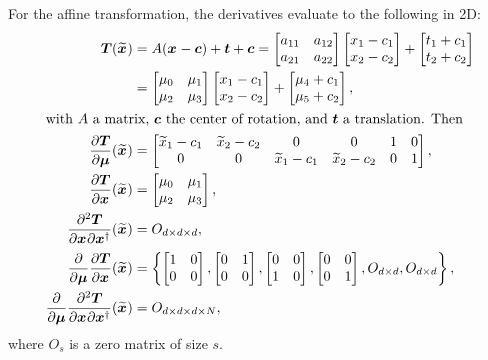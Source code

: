 \documentclass{InsightArticle}
\newcommand{\vT}{\bm{T}}
\newcommand{\vmu}{\bm{\mu}}
\newcommand{\vx}[1][]{\bm{x}_{#1}}
\newcommand{\vxt}[1][]{\bm{\widetilde x}_{#1}}
\newcommand{\D}[2]{\frac{\partial #1}{\partial #2}}
\newcommand{\Dd}[3]{\frac{\partial^2 #1}{\partial #2 \partial #3}}
\newcommand{\trp}{^{\dagger}}
\begin{document}
For the affine transformation, the derivatives evaluate to the
following in 2D:
\begin{align}
\vT(\vxt) &= A (\vx -\bm{c}) + \bm{t} + \bm{c} =
\begin{bmatrix} a_{11} & a_{12}
\\ a_{21} & a_{22} \end{bmatrix} \begin{bmatrix} x_1 - c_1 \\
x_2 - c_2 \end{bmatrix} + \begin{bmatrix} t_1 + c_1 \\
t_2 + c_2 \end{bmatrix} \\
 & = \begin{bmatrix} \mu_0 & \mu_1 \\
 \mu_2 & \mu_3 \end{bmatrix} \begin{bmatrix} x_1 - c_1 \\
x_2 - c_2 \end{bmatrix} + \begin{bmatrix} \mu_4 + c_1 \\
\mu_5 + c_2
\end{bmatrix}, \\
\intertext{with $A$ a matrix, $\bm{c}$ the center of rotation, and
$\bm{t}$ a translation. Then} \D{\vT}{\vmu}(\vxt) &=
\begin{bmatrix} \widetilde x_1 - c_1 & \widetilde x_2 - c_2 & 0 & 0 & 1 & 0 \\
0 & 0 & \widetilde x_1 - c_1 & \widetilde x_2 - c_2 & 0 &
1 \end{bmatrix}, \\
\D{\vT}{\vx}(\vxt) &= \begin{bmatrix} \mu_0 & \mu_1 \\ \mu_2 & \mu_3 \end{bmatrix}, \\
\Dd{\vT}{\vx}{\vx\trp}(\vxt) &= O_{d \times d \times d}, \\
\D{}{\vmu} \D{\vT}{\vx}(\vxt) &= \left\{ \begin{bmatrix} 1 & 0 \\
0 & 0 \end{bmatrix}, \begin{bmatrix} 0 & 1 \\ 0 & 0
\end{bmatrix}, \begin{bmatrix} 0 & 0 \\ 1 & 0
\end{bmatrix}, \begin{bmatrix} 0 & 0 \\ 0 & 1
\end{bmatrix}, O_{d \times d}, O_{d \times d} \right\}, \\
\D{}{\vmu} \Dd{\vT}{\vx}{\vx\trp}(\vxt) &= O_{d \times d \times d
\times N},
\end{align}
where $O_s$ is a zero matrix of size $s$.
\end{document}
